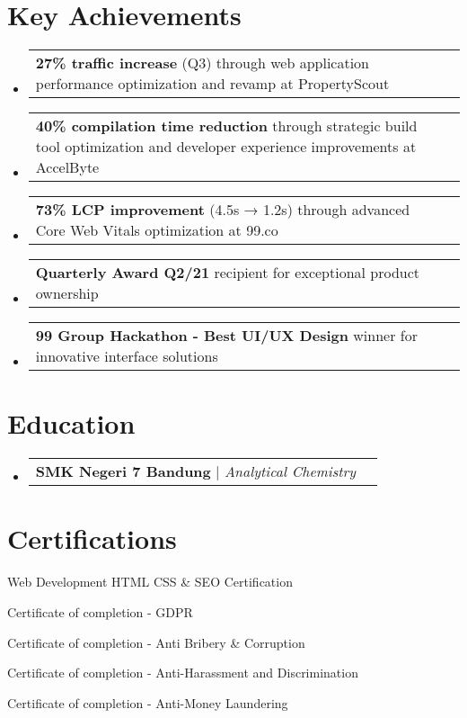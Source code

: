 \documentclass[a4paper, 11pt]{article}
\makeatletter
\newcommand{\resumeProjectHeading}[2]{
    \item
    \begin{tabular*}{0.987\textwidth}{l@{\extracolsep{\fill}}r}
      \small#1\\
    \end{tabular*}\vspace{-7pt}
}
\newcommand{\resumeSubHeadingListStart}{\begin{itemize}[leftmargin=0.1in, label={}]}
\newcommand{\resumeSubHeadingListEnd}{\end{itemize}\vspace{5pt}}
\makeatother
\begin{document}
\section{Key Achievements}
    \resumeSubHeadingListStart
        \resumeProjectHeading
            {\textbf{27\% traffic increase} (Q3) through web application performance optimization and revamp at PropertyScout}{2023}
        \resumeProjectHeading
            {\textbf{40\% compilation time reduction} through strategic build tool optimization and developer experience improvements at AccelByte}{2022}
        \resumeProjectHeading
            {\textbf{73\% LCP improvement} (4.5s → 1.2s) through advanced Core Web Vitals optimization at 99.co}{2021}
        \resumeProjectHeading
            {\textbf{Quarterly Award Q2/21} recipient for exceptional product ownership}{2021}
        \resumeProjectHeading
            {\textbf{99 Group Hackathon - Best UI/UX Design} winner for innovative interface solutions}{2021}
    \resumeSubHeadingListEnd

\section{Education}
    \resumeSubHeadingListStart
        \resumeProjectHeading
            {\textbf{SMK Negeri 7 Bandung} $|$ \emph{Analytical Chemistry}}{2009 -- 2011}
    \resumeSubHeadingListEnd

\section{Certifications}
    \resumeSubHeadingListStart
        \small{
            \item Web Development HTML CSS \& SEO Certification
            \item Certificate of completion - GDPR
            \item Certificate of completion - Anti Bribery \& Corruption
            \item Certificate of completion - Anti-Harassment and Discrimination
            \item Certificate of completion - Anti-Money Laundering
        }
    \resumeSubHeadingListEnd

\end{document}

